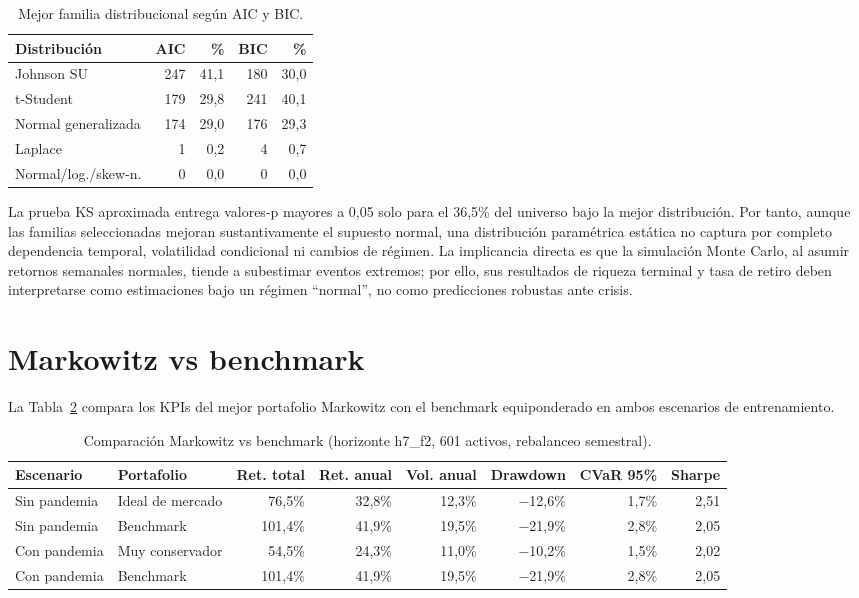 \begin{table}[h]
\centering
\caption{Mejor familia distribucional seg\'un AIC y BIC.}
\label{tab:best_dist}
\scriptsize
\begin{tabular}{@{}lrrrr@{}}
\toprule
Distribuci\'on & AIC & \% & BIC & \% \\
\midrule
Johnson SU & 247 & 41,1 & 180 & 30,0 \\
t-Student & 179 & 29,8 & 241 & 40,1 \\
Normal generalizada & 174 & 29,0 & 176 & 29,3 \\
Laplace & 1 & 0,2 & 4 & 0,7 \\
Normal/log./skew-n. & 0 & 0,0 & 0 & 0,0 \\
\bottomrule
\end{tabular}
\end{table}

La prueba KS aproximada entrega valores-p mayores a 0,05 solo para el 36,5\% del universo bajo la mejor distribuci\'on. Por tanto, aunque las familias seleccionadas mejoran sustantivamente el supuesto normal, una distribuci\'on param\'etrica est\'atica no captura por completo dependencia temporal, volatilidad condicional ni cambios de r\'egimen. La implicancia directa es que la simulaci\'on Monte Carlo, al asumir retornos semanales normales, tiende a subestimar eventos extremos; por ello, sus resultados de riqueza terminal y tasa de retiro deben interpretarse como estimaciones bajo un r\'egimen ``normal'', no como predicciones robustas ante crisis.

\section{Markowitz vs benchmark}

La Tabla~\ref{tab:markowitz_results} compara los KPIs del mejor portafolio Markowitz con el benchmark equiponderado en ambos escenarios de entrenamiento.

\begin{table}[h]
\centering
\caption{Comparaci\'on Markowitz vs benchmark (horizonte h7\_f2, 601 activos,
rebalanceo semestral).}
\label{tab:markowitz_results}
\scriptsize
\begin{tabular}{@{}llrrrrrr@{}}
\toprule
Escenario & Portafolio & Ret. total & Ret. anual & Vol. anual & Drawdown &
CVaR 95\% & Sharpe \\
\midrule
Sin pandemia & Ideal de mercado & 76,5\% & 32,8\% & 12,3\% & $-$12,6\% &
1,7\% & 2,51 \\
Sin pandemia & Benchmark & 101,4\% & 41,9\% & 19,5\% & $-$21,9\% & 2,8\% &
2,05 \\
Con pandemia & Muy conservador & 54,5\% & 24,3\% & 11,0\% & $-$10,2\% &
1,5\% & 2,02 \\
Con pandemia & Benchmark & 101,4\% & 41,9\% & 19,5\% & $-$21,9\% & 2,8\% &
2,05 \\
\bottomrule
\end{tabular}
\end{table}

